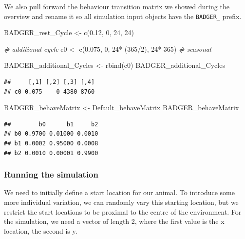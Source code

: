 \documentclass[10pt,a4paper]{article}
\newenvironment{Shaded}{}{}
\newcommand{\CommentTok}[1]{\textit{#1}}
\newcommand{\DecValTok}[1]{#1}
\newcommand{\FloatTok}[1]{#1}
\newcommand{\FunctionTok}[1]{#1}
\newcommand{\NormalTok}[1]{#1}
\newcommand{\OtherTok}[1]{#1}
\newcommand{\SpecialCharTok}[1]{#1}
\begin{document}
We also pull forward the behaviour transition matrix we showed during the overview and rename it so all simulation input objects have the \texttt{BADGER\_} prefix.

\begin{Shaded}
\begin{Highlighting}[]
\NormalTok{BADGER\_rest\_Cycle }\OtherTok{\textless{}{-}} \FunctionTok{c}\NormalTok{(}\FloatTok{0.12}\NormalTok{, }\DecValTok{0}\NormalTok{, }\DecValTok{24}\NormalTok{, }\DecValTok{24}\NormalTok{)}

\CommentTok{\# additional cycle}
\NormalTok{c0 }\OtherTok{\textless{}{-}} \FunctionTok{c}\NormalTok{(}\FloatTok{0.075}\NormalTok{, }\DecValTok{0}\NormalTok{, }\DecValTok{24}\SpecialCharTok{*}\NormalTok{ (}\DecValTok{365}\SpecialCharTok{/}\DecValTok{2}\NormalTok{), }\DecValTok{24}\SpecialCharTok{*} \DecValTok{365}\NormalTok{) }\CommentTok{\# seasonal}

\NormalTok{BADGER\_additional\_Cycles }\OtherTok{\textless{}{-}} \FunctionTok{rbind}\NormalTok{(c0)}
\NormalTok{BADGER\_additional\_Cycles}
\end{Highlighting}
\end{Shaded}

\begin{verbatim}
##     [,1] [,2] [,3] [,4]
## c0 0.075    0 4380 8760
\end{verbatim}

\begin{Shaded}
\begin{Highlighting}[]
\NormalTok{BADGER\_behaveMatrix }\OtherTok{\textless{}{-}}\NormalTok{ Default\_behaveMatrix}
\NormalTok{BADGER\_behaveMatrix}
\end{Highlighting}
\end{Shaded}

\begin{verbatim}
##        b0      b1     b2
## b0 0.9700 0.01000 0.0010
## b1 0.0002 0.95000 0.0008
## b2 0.0010 0.00001 0.9900
\end{verbatim}

\subsubsection{Running the simulation}\label{running-the-simulation}

We need to initially define a start location for our animal.
To introduce some more individual variation, we can randomly vary this starting location, but we restrict the start locations to be proximal to the centre of the environment.
For the simulation, we need a vector of length 2, where the first value is the x location, the second is y.
\end{document}
